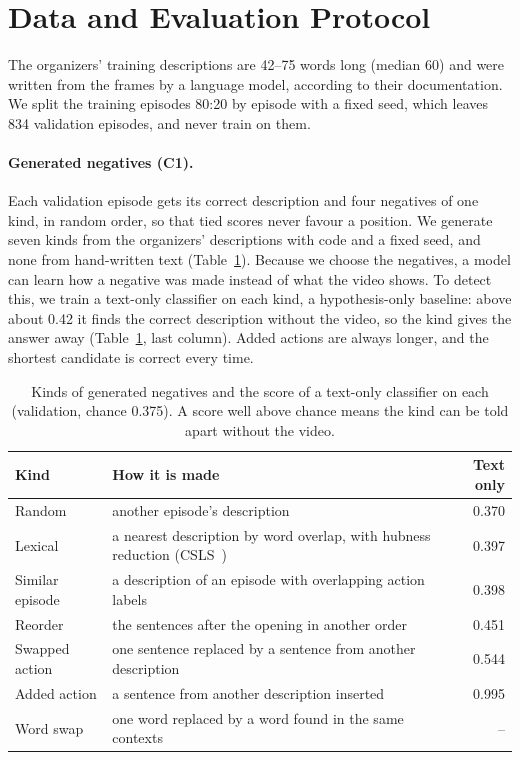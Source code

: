 \documentclass[10pt,twocolumn]{article}
\newcommand{\cha}[1]{\textsf{C#1}}
\begin{document}
\section{Data and Evaluation Protocol}

The organizers' training descriptions are 42--75 words long (median 60) and were written from the frames by a
language model, according to their documentation. We split the training episodes 80:20 by episode with a fixed
seed, which leaves 834 validation episodes, and never train on them.

\paragraph{Generated negatives (\cha1).} Each validation episode gets its correct description and four negatives
of one kind, in random order, so that tied scores never favour a position. We generate seven kinds from the
organizers' descriptions with code and a fixed seed, and none from hand-written text
(Table~\ref{tab:negatives}). Because we choose the negatives, a model can learn how a negative was made instead of
what the video shows. To detect this, we train a text-only classifier on each kind, a hypothesis-only baseline:
above about 0.42 it finds the correct description without the video, so the kind gives the answer away
(Table~\ref{tab:negatives}, last column). Added actions are always longer, and the shortest candidate is correct
every time.

\begin{table}[t]
\caption{Kinds of generated negatives and the score of a text-only classifier on each (validation, chance
0.375). A score well above chance means the kind can be told apart without the video.}
\label{tab:negatives}
\footnotesize
\setlength{\tabcolsep}{3pt}
\begin{tabularx}{\columnwidth}{>{\raggedright\arraybackslash}p{1.75cm}>{\raggedright\arraybackslash}Xr}
\toprule
Kind & How it is made & Text only \\
\midrule
Random & another episode's description & 0.370 \\
Lexical & a nearest description by word overlap, with hubness reduction (CSLS~\cite{conneau2018csls}) & 0.397 \\
Similar episode & a description of an episode with overlapping action labels & 0.398 \\
Reorder & the sentences after the opening in another order & 0.451 \\
Swapped action & one sentence replaced by a sentence from another description & 0.544 \\
Added action & a sentence from another description inserted & 0.995 \\
Word swap & one word replaced by a word found in the same contexts & -- \\
\bottomrule
\end{tabularx}
\end{table}
\end{document}
